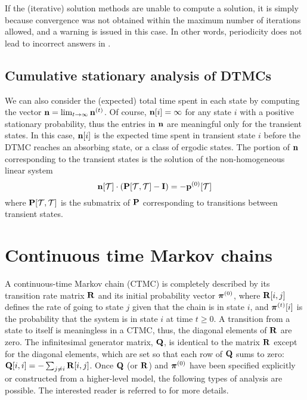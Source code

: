 If the (iterative) solution methods are unable to compute a
solution, it is simply because convergence was not obtained within
the maximum number of iterations allowed, and a warning is issued
in this case.  In other words, periodicity does not lead to
incorrect answers in {\smart}.


\subsection{Cumulative stationary analysis of DTMCs}\label{SEC:fundamental}
We can also consider the (expected) total time spent in each state
by computing the vector $\vn = \lim_{t \to\infty} \vn^{(t)}$. Of
course, $\vn[i] = \infty$ for any state $i$ with a positive
stationary probability,
thus the entries in $\vn$ are meaningful
only for the transient states. In this case, $\vn[i]$ is the
expected time spent in transient state $i$ before the DTMC reaches
an absorbing state, or a class of ergodic states. The portion of
$\vn$ corresponding to the transient states is the solution of the
non-homogeneous linear system
\[
  \vn[\Set{T}] \cdot (\P[\Set{T}, \Set{T}] - \I)
  = -\vp^{(0)}[\Set{T}]
\]
where $\P[\Set{T}, \Set{T}]$ is the submatrix of $\P$
corresponding to transitions between transient states.

\section{Continuous time Markov chains}
A continuous-time Markov chain (CTMC)
is completely described by its transition
rate matrix $\R$ and its initial probability vector
$\gvect{\pi}^{(0)}$, where $\R[i,j]$ defines the rate of going to state
$j$ given that the chain is in state $i$, and
$\gvect{\pi}^{(t)}[i]$ is the probability that the system is
in state $i$ at time $t \geq 0$.
A transition from a state to itself is meaningless in a CTMC,
thus, the diagonal elements of $\R$ are zero.
The infinitesimal generator matrix, $\Q$, is identical to the matrix $\R$
except for the diagonal elements, which are set so that each row of
$\Q$ sums to zero: $\Q[i,i] = - \sum_{j \neq i} \R[i,j]$.
Once $\Q$ (or $\R$) and $\gvect{\pi}^{(0)}$ have been specified explicitly
or constructed from a higher-level model, the following types of analysis
are possible.
The interested reader is referred to \cite{1993IMA-SRNs,Stewart1994book}
for more details.

